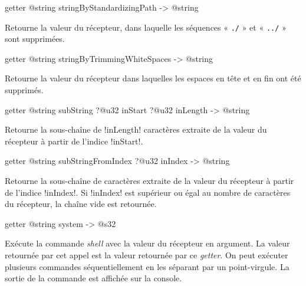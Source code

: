 
\begin{galgas4box}
getter @string stringByStandardizingPath -> @string
\end{galgas4box}

Retourne la valeur du récepteur, dans laquelle les séquences « \texttt{./} » et « \texttt{../} » sont supprimées.








\begin{galgas4box}
getter @string stringByTrimmingWhiteSpaces -> @string
\end{galgas4box}

Retourne la valeur du récepteur dans laquelles les espaces en tête et en fin ont été supprimés.





\begin{galgas4box}
getter @string subString ?@u32 inStart ?@u32 inLength -> @string
\end{galgas4box}

Retourne la sous-chaîne de \ggsq!inLength! caractères extraite de la valeur du récepteur à partir de l'indice \ggsq!inStart!.







\begin{galgas4box}
getter @string subStringFromIndex ?@u32 inIndex -> @string
\end{galgas4box}

Retourne la sous-chaîne de caractères extraite de la valeur du récepteur à partir de l'indice \ggsq!inIndex!. Si \ggsq!inIndex! est supérieur ou égal au nombre de caractères du récepteur, la chaîne vide est retournée.







\begin{galgas4box}
getter @string system -> @s32
\end{galgas4box}


Exécute la commande \emph{shell} avec la valeur du récepteur en argument. La valeur retournée par cet appel est la valeur retournée par ce \emph{getter}. On peut exécuter plusieurs commandes séquentiellement en les séparant par un point-virgule. La sortie de la commande est affichée sur la console.

